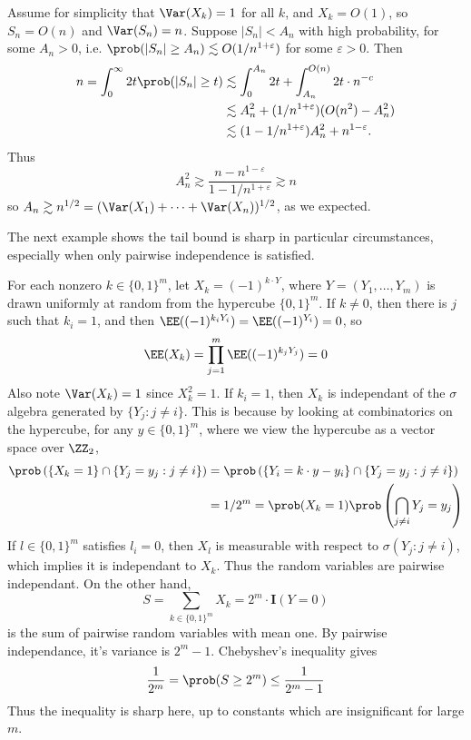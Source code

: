 \begin{example}
    Assume for simplicity that $\Var(X_k) = 1$ for all $k$, and $X_k = O(1)$, so $S_n = O(n)$ and $\Var(S_n) = n$. Suppose $|S_n| < A_n$ with high probability, for some $A_n > 0$, i.e. $\prob(|S_n| \geq A_n) \lesssim O(1/n^{1 + \varepsilon})$ for some $\varepsilon > 0$. Then
    \begin{align*}
        n = \int_0^\infty 2t \prob(|S_n| \geq t) &\lesssim \int_0^{A_n} 2t + \int_{A_n}^{O(n)} 2t \cdot n^{-c} \\
        &\lesssim A_n^2 + (1/n^{1 + \varepsilon}) (O(n^2) - A_n^2)\\
        &\lesssim (1 - 1/n^{1 + \varepsilon}) A_n^2 + n^{1-\varepsilon}.
    \end{align*}
    Thus
    \[ A_n^2 \gtrsim \frac{n - n^{1 - \varepsilon}}{1 - 1/n^{1 + \varepsilon}} \gtrsim n \]
    so $A_n \gtrsim n^{1/2} = (\Var(X_1) + \dots + \Var(X_n))^{1/2}$, as we expected.
\end{example}

The next example shows the tail bound is sharp in particular circumstances, especially when only pairwise independence is satisfied.

\begin{example}
    For each nonzero $k \in \{0,1\}^m$, let $X_k = (-1)^{k \cdot Y}$, where $Y = (Y_1, \dots, Y_m)$ is drawn uniformly at random from the hypercube $\{0,1\}^m$. If $k \neq 0$, then there is $j$ such that $k_i = 1$, and then $\EE((-1)^{k_i Y_i}) = \EE((-1)^{Y_i}) = 0$, so
    \[ \EE(X_k) = \prod_{j = 1}^m \EE((-1)^{k_j Y_j}) = 0 \]
    Also note $\Var(X_k) = 1$ since $X_k^2 = 1$. If $k_i = 1$, then $X_k$ is independant of the $\sigma$ algebra generated by $\{ Y_j : j \neq i \}$. This is because by looking at combinatorics on the hypercube, for any $y \in \{ 0, 1 \}^m$, where we view the hypercube as a vector space over $\ZZ_2$,
    \begin{align*}
        \prob \left( \{ X_k = 1 \} \cap \{ Y_j = y_j : j \neq i \} \right) &= \prob \left( \{ Y_i = k \cdot y - y_i \} \cap \{ Y_j = y_j : j \neq i \} \right)\\
        &= 1/2^m = \prob(X_k = 1) \prob \left( \bigcap_{j \neq i} Y_j = y_j \right)
    \end{align*}
    If $l \in \{ 0, 1 \}^m$ satisfies $l_i = 0$, then $X_l$ is measurable with respect to $\sigma(Y_j: j \neq i)$, which implies it is independant to $X_k$. Thus the random variables are pairwise independant. On the other hand,
    \[ S = \sum_{k \in \{0,1\}^m} X_k = 2^m \cdot \mathbf{I}(Y = 0) \]
    is the sum of pairwise random variables with mean one. By pairwise independance, it's variance is $2^m - 1$. Chebyshev's inequality gives
    \[ \frac{1}{2^m} = \prob(S \geq 2^m) \leq \frac{1}{2^m - 1} \]
    Thus the inequality is sharp here, up to constants which are insignificant for large $m$.
\end{example}

